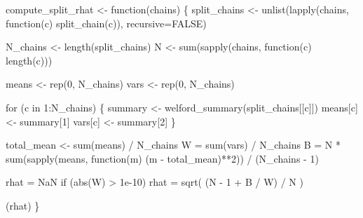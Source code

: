 \documentclass[
  letterpaper,
  DIV=11,
  numbers=noendperiod]{scrartcl}
\newenvironment{Shaded}{\begin{snugshade}}{\end{snugshade}}
\newcommand{\AttributeTok}[1]{\textcolor[rgb]{0.40,0.45,0.13}{#1}}
\newcommand{\ConstantTok}[1]{\textcolor[rgb]{0.56,0.35,0.01}{#1}}
\newcommand{\ControlFlowTok}[1]{\textcolor[rgb]{0.00,0.23,0.31}{#1}}
\newcommand{\DecValTok}[1]{\textcolor[rgb]{0.68,0.00,0.00}{#1}}
\newcommand{\FloatTok}[1]{\textcolor[rgb]{0.68,0.00,0.00}{#1}}
\newcommand{\FunctionTok}[1]{\textcolor[rgb]{0.28,0.35,0.67}{#1}}
\newcommand{\NormalTok}[1]{\textcolor[rgb]{0.00,0.23,0.31}{#1}}
\newcommand{\OtherTok}[1]{\textcolor[rgb]{0.00,0.23,0.31}{#1}}
\newcommand{\SpecialCharTok}[1]{\textcolor[rgb]{0.37,0.37,0.37}{#1}}
\begin{document}
\begin{Shaded}
\begin{Highlighting}[]
\NormalTok{compute\_split\_rhat }\OtherTok{\textless{}{-}} \ControlFlowTok{function}\NormalTok{(chains) \{}
\NormalTok{  split\_chains }\OtherTok{\textless{}{-}} \FunctionTok{unlist}\NormalTok{(}\FunctionTok{lapply}\NormalTok{(chains, }\ControlFlowTok{function}\NormalTok{(c) }\FunctionTok{split\_chain}\NormalTok{(c)),}
                         \AttributeTok{recursive=}\ConstantTok{FALSE}\NormalTok{)}

\NormalTok{  N\_chains }\OtherTok{\textless{}{-}} \FunctionTok{length}\NormalTok{(split\_chains)}
\NormalTok{  N }\OtherTok{\textless{}{-}} \FunctionTok{sum}\NormalTok{(}\FunctionTok{sapply}\NormalTok{(chains, }\ControlFlowTok{function}\NormalTok{(c) }\FunctionTok{length}\NormalTok{(c)))}

\NormalTok{  means }\OtherTok{\textless{}{-}} \FunctionTok{rep}\NormalTok{(}\DecValTok{0}\NormalTok{, N\_chains)}
\NormalTok{  vars }\OtherTok{\textless{}{-}} \FunctionTok{rep}\NormalTok{(}\DecValTok{0}\NormalTok{, N\_chains)}

  \ControlFlowTok{for}\NormalTok{ (c }\ControlFlowTok{in} \DecValTok{1}\SpecialCharTok{:}\NormalTok{N\_chains) \{}
\NormalTok{    summary }\OtherTok{\textless{}{-}} \FunctionTok{welford\_summary}\NormalTok{(split\_chains[[c]])}
\NormalTok{    means[c] }\OtherTok{\textless{}{-}}\NormalTok{ summary[}\DecValTok{1}\NormalTok{]}
\NormalTok{    vars[c] }\OtherTok{\textless{}{-}}\NormalTok{ summary[}\DecValTok{2}\NormalTok{]}
\NormalTok{  \}}

\NormalTok{  total\_mean }\OtherTok{\textless{}{-}} \FunctionTok{sum}\NormalTok{(means) }\SpecialCharTok{/}\NormalTok{ N\_chains}
\NormalTok{  W }\OtherTok{=} \FunctionTok{sum}\NormalTok{(vars) }\SpecialCharTok{/}\NormalTok{ N\_chains}
\NormalTok{  B }\OtherTok{=}\NormalTok{ N }\SpecialCharTok{*} \FunctionTok{sum}\NormalTok{(}\FunctionTok{sapply}\NormalTok{(means, }\ControlFlowTok{function}\NormalTok{(m)}
\NormalTok{                            (m }\SpecialCharTok{{-}}\NormalTok{ total\_mean)}\SpecialCharTok{**}\DecValTok{2}\NormalTok{)) }\SpecialCharTok{/}\NormalTok{ (N\_chains }\SpecialCharTok{{-}} \DecValTok{1}\NormalTok{)}

\NormalTok{  rhat }\OtherTok{=} \ConstantTok{NaN}
  \ControlFlowTok{if}\NormalTok{ (}\FunctionTok{abs}\NormalTok{(W) }\SpecialCharTok{\textgreater{}} \FloatTok{1e{-}10}\NormalTok{)}
\NormalTok{    rhat }\OtherTok{=} \FunctionTok{sqrt}\NormalTok{( (N }\SpecialCharTok{{-}} \DecValTok{1} \SpecialCharTok{+}\NormalTok{ B }\SpecialCharTok{/}\NormalTok{ W) }\SpecialCharTok{/}\NormalTok{ N )}

\NormalTok{  (rhat)}
\NormalTok{\}}
\end{Highlighting}
\end{Shaded}
\end{document}
